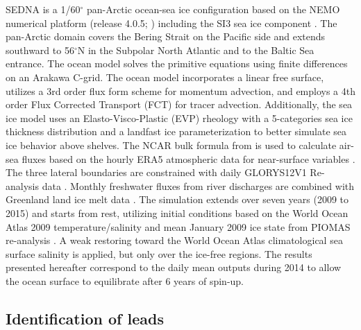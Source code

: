 \documentclass[draft]{agujournal2019}
\begin{document}
SEDNA is a 1/60$^\circ$ pan-Arctic ocean-sea ice configuration based on the NEMO numerical platform (release 4.0.5; ) including the SI3 sea ice component . The pan-Arctic domain covers the Bering Strait on the Pacific side and extends southward to 56$^\circ$N in the Subpolar North Atlantic and to the Baltic Sea entrance. The ocean model solves the primitive equations using finite differences on an Arakawa C-grid. The ocean model incorporates a linear free surface, utilizes a 3rd order flux form scheme for momentum advection, and employs a 4th order Flux Corrected Transport (FCT) for tracer advection. Additionally, the sea ice model uses an Elasto-Visco-Plastic (EVP) rheology with a 5-categories sea ice thickness distribution and a landfast ice parameterization to better simulate sea ice behavior above shelves. The NCAR bulk formula from  is used to calculate air-sea fluxes based on the hourly ERA5 atmospheric data for near-surface variables \cite{Hersbach_ERA5_2020}. The three lateral boundaries are constrained with daily GLORYS12V1 Re-analysis data \cite{GLORYS12}. Monthly freshwater fluxes from river discharges are combined with Greenland land ice melt data \cite{HuEA_rivers_2019}. The simulation extends over seven years (2009 to 2015) and starts from rest, utilizing initial conditions based on the World Ocean Atlas 2009 temperature/salinity and mean January 2009 ice state from PIOMAS re-analysis \cite{Locarnini_data_2010, PIOMAS}. A weak restoring toward the World Ocean Atlas climatological sea surface salinity is applied, but only over the ice-free regions. The results presented hereafter correspond to the daily mean outputs during 2014 to allow the ocean surface to equilibrate after 6 years of spin-up. %

\subsection{Identification of leads}
\end{document}
